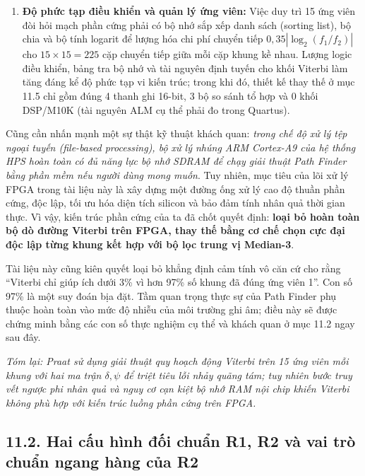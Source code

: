 \begin{enumerate}
    \item \textbf{Độ phức tạp điều khiển và quản lý ứng viên:}
    Việc duy trì 15 ứng viên đòi hỏi mạch phần cứng phải có bộ nhớ sắp xếp danh sách (sorting list), bộ chia và bộ tính logarit để lượng hóa chi phí chuyển tiếp $0{,}35|\log_2(f_1/f_2)|$ cho $15 \times 15 = 225$ cặp chuyển tiếp giữa mỗi cặp khung kề nhau. Lượng logic điều khiển, bảng tra bộ nhớ và tài nguyên định tuyến cho khối Viterbi làm tăng đáng kể độ phức tạp vi kiến trúc; trong khi đó, thiết kế thay thế ở mục 11.5 chỉ gồm đúng 4 thanh ghi 16-bit, 3 bộ so sánh tổ hợp và 0 khối DSP/M10K (tài nguyên ALM cụ thể phải đo trong Quartus).
\end{enumerate}

Cũng cần nhấn mạnh một sự thật kỹ thuật khách quan: \emph{trong chế độ xử lý tệp ngoại tuyến (file-based processing), bộ xử lý nhúng ARM Cortex-A9 của hệ thống HPS hoàn toàn có đủ năng lực bộ nhớ SDRAM để chạy giải thuật Path Finder bằng phần mềm nếu người dùng mong muốn}.
Tuy nhiên, mục tiêu của lõi xử lý FPGA trong tài liệu này là xây dựng một đường ống xử lý cao độ thuần phần cứng, độc lập, tối ưu hóa diện tích silicon và bảo đảm tính nhân quả thời gian thực.
Vì vậy, kiến trúc phần cứng của ta đã chốt quyết định: \textbf{loại bỏ hoàn toàn bộ dò đường Viterbi trên FPGA, thay thế bằng cơ chế chọn cực đại độc lập từng khung kết hợp với bộ lọc trung vị Median-3}.

Tài liệu này cũng kiên quyết loại bỏ khẳng định cảm tính vô căn cứ cho rằng ``Viterbi chỉ giúp ích dưới 3\% vì hơn 97\% số khung đã đúng ứng viên 1''. Con số 97\% là một suy đoán bịa đặt. Tầm quan trọng thực sự của Path Finder phụ thuộc hoàn toàn vào mức độ nhiễu của môi trường ghi âm; điều này sẽ được chứng minh bằng các con số thực nghiệm cụ thể và khách quan ở mục 11.2 ngay sau đây.

\textit{Tóm lại: Praat sử dụng giải thuật quy hoạch động Viterbi trên 15 ứng viên mỗi khung với hai ma trận $\delta, \psi$ để triệt tiêu lỗi nhảy quãng tám; tuy nhiên bước truy vết ngược phi nhân quả và nguy cơ cạn kiệt bộ nhớ RAM nội chip khiến Viterbi không phù hợp với kiến trúc luồng phần cứng trên FPGA.}

\subsection*{11.2. Hai cấu hình đối chuẩn R1, R2 và vai trò chuẩn ngang hàng của R2}

